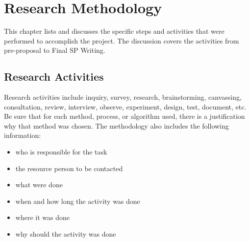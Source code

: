 \chapter{Research Methodology}
This chapter lists and discusses the specific steps and activities that  were  performed  to accomplish the project. 
The discussion covers the activities from pre-proposal to Final SP Writing.

\section{Research Activities}
Research activities include inquiry, survey, research, brainstorming, canvassing, consultation, review, interview, observe, experiment, design, test, document, etc.  
Be sure that for each method, process, or algorithm used, there is a justification why that method was chosen.
The methodology also includes the following information:

\begin{itemize}
   \item who is responsible for the task
   \item the resource person to be contacted
   \item what were done
   \item when and how long the activity was  done
   \item where it was done
   \item why should the activity was done
\end{itemize}


